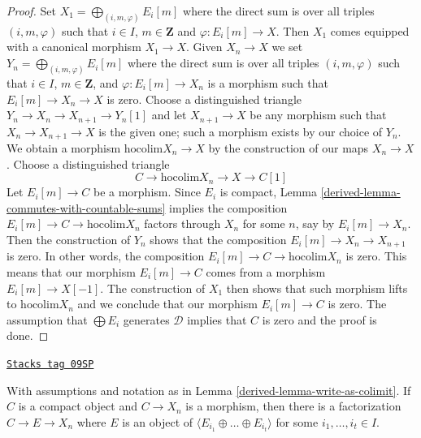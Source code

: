 \begin{proof}

Set $X_1 = \bigoplus_{(i, m, \varphi)} E_i[m]$ where the direct sum is over
all triples $(i, m, \varphi)$ such that $i \in I$, $m \in \mathbf{Z}$
and $\varphi : E_i[m] \to X$. Then $X_1$ comes equipped with a canonical
morphism $X_1 \to X$. Given $X_n \to X$ we set
$Y_n = \bigoplus_{(i, m, \varphi)} E_i[m]$ where the direct sum is over
all triples $(i, m, \varphi)$ such that $i \in I$, $m \in \mathbf{Z}$, and
$\varphi : E_i[m] \to X_n$ is a morphism such that $E_i[m] \to X_n \to X$
is zero. Choose a distinguished triangle
$Y_n \to X_n \to X_{n + 1} \to Y_n[1]$
and let $X_{n + 1} \to X$ be any morphism such that $X_n \to X_{n + 1} \to X$
is the given one; such a morphism exists by our choice of $Y_n$.
We obtain a morphism $\text{hocolim} X_n \to X$ by the construction
of our maps $X_n \to X$. Choose a distinguished triangle
$$
C \to \text{hocolim} X_n \to X \to C[1]
$$
Let $E_i[m] \to C$ be a morphism. Since $E_i$ is compact,
Lemma \ref{derived-lemma-commutes-with-countable-sums}
implies the composition $E_i[m] \to C \to \text{hocolim} X_n$ factors through
$X_n$ for some $n$, say by $E_i[m] \to X_n$. Then the
construction of $Y_n$ shows that the composition
$E_i[m] \to X_n \to X_{n + 1}$ is zero. In other words, the composition
$E_i[m] \to C \to \text{hocolim} X_n$ is zero. This means that our
morphism $E_i[m] \to C$ comes from a morphism $E_i[m] \to X[-1]$.
The construction of $X_1$ then shows that such morphism lifts to
$\text{hocolim} X_n$ and we conclude that our morphism $E_i[m] \to C$
is zero. The assumption that $\bigoplus E_i$ generates $\mathcal{D}$
implies that $C$ is zero and the proof is done.
\end{proof}

\begin{lemma}
\label{derived-lemma-factor-through}
\href{https://stacks.math.columbia.edu/tag/09SP}{\texttt{Stacks tag 09SP}}

With assumptions and notation as in Lemma \ref{derived-lemma-write-as-colimit}.
If $C$ is a compact object and $C \to X_n$ is a morphism, then
there is a factorization $C \to E \to X_n$ where
$E$ is an object of $\langle E_{i_1} \oplus \ldots \oplus E_{i_t} \rangle$
for some $i_1, \ldots, i_t \in I$.
\end{lemma}

